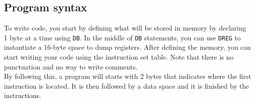 \documentclass[a4paper,12pt]{article}
\begin{document}
\subsection{Program syntax}

To write code, you start by defining what will be stored in memory by declaring 1 byte at a time using \texttt{DB}. In the middle of \texttt{DB} statements, you can use \texttt{DREG} to instantiate a 16-byte space to dump registers. After defining the memory, you can start writing your code using the instruction set table. Note that there is no punctuation and no way to write comments.\\
By following this, a program will starts with 2 bytes that indicates where the first instruction is located. It is then followed by a data space and it is finished by the instructions.
\end{document}
